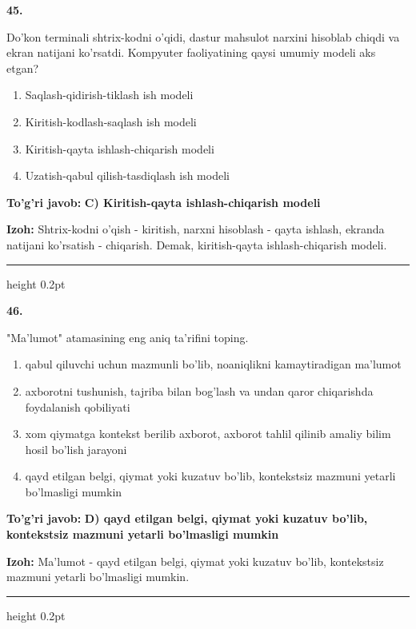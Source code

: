 \documentclass[10pt,a4paper,oneside]{article}
\begin{document}
\noindent\textbf{\color{ink}45.}
\par
Do'kon terminali shtrix-kodni o'qidi, dastur mahsulot narxini hisoblab chiqdi va ekran natijani ko'rsatdi. Kompyuter faoliyatining qaysi umumiy modeli aks etgan?
\begin{enumerate}[label=\Alph*),leftmargin=9mm]
\item Saqlash-qidirish-tiklash ish modeli
\item Kiritish-kodlash-saqlash ish modeli
\item Kiritish-qayta ishlash-chiqarish modeli
\item Uzatish-qabul qilish-tasdiqlash ish modeli
\end{enumerate}
\begin{tcolorbox}[enhanced,breakable,colback=teal!4,colframe=teal!50!black,boxrule=0.5pt,arc=1.1mm,left=3mm,right=3mm,top=1.7mm,bottom=1.7mm,before skip=2mm,after skip=2mm]
\textbf{\color{teal}To'g'ri javob:} \textbf{C) Kiritish-qayta ishlash-chiqarish modeli}
\par\smallskip
\textbf{Izoh:} Shtrix-kodni o'qish - kiritish, narxni hisoblash - qayta ishlash, ekranda natijani ko'rsatish - chiqarish. Demak, kiritish-qayta ishlash-chiqarish modeli.
\end{tcolorbox}
\vspace{2mm}\hrule height 0.2pt \vspace{3mm}

\noindent\textbf{\color{ink}46.}
\par
"Ma'lumot" atamasining eng aniq ta'rifini toping.
\begin{enumerate}[label=\Alph*),leftmargin=9mm]
\item qabul qiluvchi uchun mazmunli bo'lib, noaniqlikni kamaytiradigan ma'lumot
\item axborotni tushunish, tajriba bilan bog'lash va undan qaror chiqarishda foydalanish qobiliyati
\item xom qiymatga kontekst berilib axborot, axborot tahlil qilinib amaliy bilim hosil bo'lish jarayoni
\item qayd etilgan belgi, qiymat yoki kuzatuv bo'lib, kontekstsiz mazmuni yetarli bo'lmasligi mumkin
\end{enumerate}
\begin{tcolorbox}[enhanced,breakable,colback=teal!4,colframe=teal!50!black,boxrule=0.5pt,arc=1.1mm,left=3mm,right=3mm,top=1.7mm,bottom=1.7mm,before skip=2mm,after skip=2mm]
\textbf{\color{teal}To'g'ri javob:} \textbf{D) qayd etilgan belgi, qiymat yoki kuzatuv bo'lib, kontekstsiz mazmuni yetarli bo'lmasligi mumkin}
\par\smallskip
\textbf{Izoh:} Ma'lumot - qayd etilgan belgi, qiymat yoki kuzatuv bo'lib, kontekstsiz mazmuni yetarli bo'lmasligi mumkin.
\end{tcolorbox}
\vspace{2mm}\hrule height 0.2pt \vspace{3mm}
\end{document}
